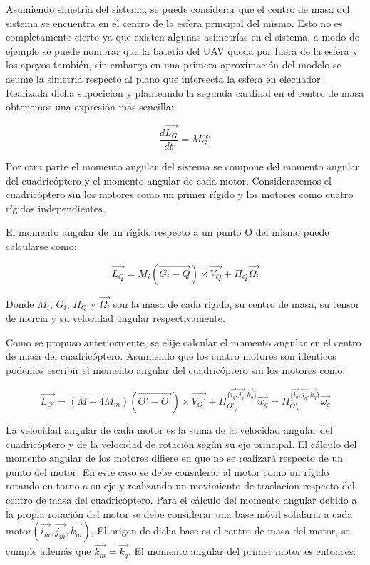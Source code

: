 \documentclass[main]{subfiles}
\begin{document}
Asumiendo simetr\'ia del sistema, se puede considerar que el centro de masa del sistema se encuentra en el centro de la esfera principal del mismo. Esto no es completamente cierto ya que existen algunas asimetr\'ias en el sistema, a modo de ejemplo se puede nombrar que la bater\'ia del UAV queda por fuera de la esfera y los apoyos tambi\'en, sin embargo en una primera aproximaci\'on del modelo se asume la simetr\'ia respecto al plano que intersecta la esfera en elecuador. Realizada dicha supocici\'on y planteando la segunda cardinal en el centro de masa obtenemos una expresi\'on m\'as sencilla:

$$\frac{d\vec{L_G}}{dt} =M_G^{ext}$$



Por otra parte el momento angular del sistema se compone del momento angular del cuadric\'optero y el momento angular de cada motor. Consideraremos el cuadric\'optero sin los motores como un primer r\'igido y los motores como cuatro r\'igidos independientes.

El momento angular de un r\'igido respecto a un punto Q del mismo puede calcularse como:

$$\vec{L_Q} = M_i(\vec{G_i-Q})\times\vec{V_Q}+\Pi_{Q}\vec{\Omega_i}$$

Donde $M_i$, $G_i$, $\Pi_{Q}$ y $\vec{\Omega_i}$ son la masa de cada r\'igido, su centro de masa, su tensor de inercia y su velocidad angular respectivamente.

Como se propuso anteriormente, se elije calcular el momento angular en el centro de masa del cuadric\'optero. Asumiendo que los cuatro motores son id\'enticos podemos escribir el momento angular del cuadric\'optero sin los motores como:

$$\vec{L_{O\prime}} = (M-4 M_m)(\vec{O\prime-O\prime})\times\vec{V_O\prime}+\Pi_{O\prime_q}^{\{\vec{i_q}, \vec{j_q}, \vec{k_q}\}}\vec{w_q}=\Pi_{O\prime_q}^{\{\vec{i_q}, \vec{j_q}, \vec{k_q}\}}\vec{\omega_q}$$

La velocidad angular de cada motor es la suma de la velocidad angular del cuadric\'optero y de la velocidad de rotaci\'on seg\'un su eje principal. El c\'alculo del momento angular de los motores difiere en que no se realizar\'a respecto de un punto del motor. En este caso se debe considerar al motor como un r\'igido rotando en torno a su eje y realizando un movimiento de traslaci\'on respecto del centro de masa del cuadric\'optero. Para el c\'alculo del momento angular debido a la propia rotaci\'on del motor se debe considerar una base m\'ovil solidaria a cada motor$(\vec{i_m}, \vec{j_m}, \vec{k_m})$, El origen de dicha base es el centro de masa del motor, se cumple adem\'as que $\vec{k_m}=\vec{k_q}$. El momento angular del primer motor es entonces:
\end{document}
